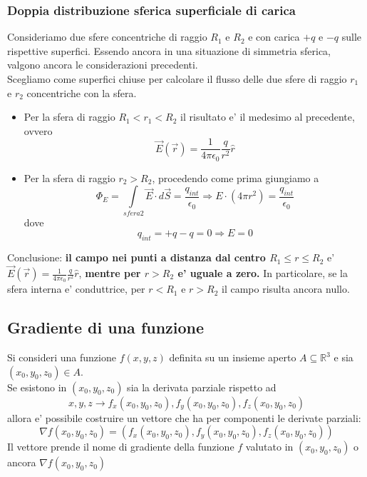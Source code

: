 \documentclass[a4paper, 10pt]{article}
\begin{document}
			\subsubsection{Doppia distribuzione sferica superficiale di carica}
				Consideriamo due sfere concentriche di raggio $R_1$ e $R_2$ e con carica $+q$ e $-q$ sulle rispettive superfici.
				Essendo ancora in una situazione di simmetria sferica, valgono ancora le considerazioni precedenti. \\
				Scegliamo come superfici chiuse per calcolare il flusso delle due sfere di raggio $r_1$ e $r_2$ concentriche 
				con la sfera.
				\begin{itemize}
					\item Per la sfera di raggio $R_1 < r_1 < R_2$ il risultato e' il medesimo al precedente, ovvero 
					\[ \overrightarrow{E}(\overrightarrow{r}) = \frac{1}{4\pi \epsilon_0}\frac{q}{r^2}\widehat{r} \]
					\item Per la sfera di raggio $r_2 > R_2$, procedendo come prima giungiamo a 
					\[ \Phi_E = \underset{sfera2}{\int} \overrightarrow{E} \cdot d\overrightarrow{S} = \frac{q_{int}}{\epsilon_0}
					\Rightarrow E \cdot (4 \pi r^2) = \frac{q_{int}}{\epsilon_0} \]
					dove \[ q_{int} = +q - q = 0 \Rightarrow E = 0 \]
				\end{itemize}
				Conclusione: \textbf{il campo nei punti a distanza dal centro $R_1 \leq r \leq R_2$} e' \\ 
				$\overrightarrow{E}(\overrightarrow{r}) = \frac{1}{4\pi \epsilon_0}\frac{q}{r^2}\widehat{r}$, \textbf{mentre per 
				$r > R_2$ e' uguale a zero.} In particolare, se la sfera interna e' conduttrice, per $r < R_1$ e $r > R_2$ il 
				campo risulta ancora nullo.
		\subsection{Gradiente di una funzione}
		Si consideri una funzione $f(x,y,z)$ definita su un insieme aperto $A \subseteq \mathbb{R}^3$ e sia $(x_0,y_0,z_0) 
		\in A$. \\ Se esistono in $(x_0,y_0,z_0)$ sia la derivata parziale rispetto ad \[x,y,z \rightarrow 
		f_x(x_0,y_0,z_0), f_y(x_0,y_0,z_0), f_z(x_0,y_0,z_0) \] allora e' possibile costruire un 
		vettore che ha per componenti le derivate parziali: 
		\[ \nabla f(x_0,y_0,z_0) = (f_x(x_0,y_0, z_0) , f_y(x_0,y_0,z_0), f_z(x_0,y_0,z_0)) \]
		Il vettore prende il nome di gradiente della funzione $f$ valutato in $(x_0,y_0,z_0)$ o 
		ancora $\nabla f(x_0,y_0,z_0)$
\end{document}
